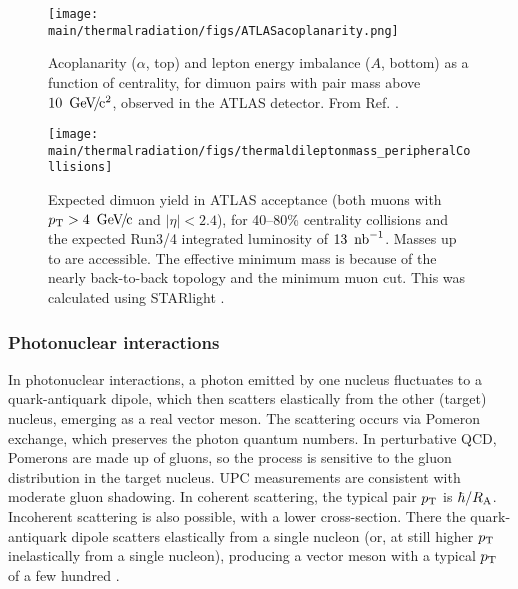 \documentclass[../report.tex]{subfiles}
\providecommand{\main}{..}
\begin{document}
\begin{figure}[htb]
\centering
\texttt{[image: \\main/thermalradiation/figs/ATLASacoplanarity.png]}
\caption{Acoplanarity ($\alpha$, top) and lepton energy imbalance ($A$, bottom) as a function of centrality, for dimuon pairs with pair mass above $\unit[10]{\UGeVcc}$, observed in the ATLAS detector.  From Ref. \cite{Aaboud:2018eph}.}
\label{fig:ATLASacoplanarity}
\end{figure}

\begin{figure}[htb]
\centering
\texttt{[image: \\main/thermalradiation/figs/thermaldileptonmass\_peripheralCollisions]}
\caption{Expected dimuon yield in ATLAS acceptance (both muons with $\pT>\unit[4]{\UGeVc}$ and $|\eta|<2.4$), for 40--80\% centrality \PbPb{} collisions and the expected Run3/4 integrated luminosity of $\unit[13]{\Unb^{-1}}$.  Masses up to \unit[100]{\UGeVcc} are accessible.  The effective \unit[8]{\UGeVcc} minimum mass is because of the nearly back-to-back topology and the \unit[4]{\UGeVc} minimum muon \pT{} cut. This was calculated using STARlight \cite{Klein:2016yzr,Klein:2018cjh}.
}
\label{fig:project} 
\end{figure}


\subsubsection{Photonuclear interactions}

In photonuclear interactions, a photon emitted by one nucleus fluctuates to a quark-antiquark dipole, which then scatters elastically from the other (target) nucleus, emerging as a real vector meson.  The scattering occurs via Pomeron exchange, which preserves the photon quantum numbers.  In perturbative QCD, Pomerons are made up of gluons, so the process is sensitive to the gluon distribution in the target nucleus.  UPC measurements are consistent with moderate gluon shadowing.   In coherent scattering, the typical pair $p\sb{\scriptstyle\mathrm{T}}$ is $\hbar/R_{\rm A}$.  Incoherent scattering is also possible, with a lower cross-section.  There the quark-antiquark dipole scatters elastically from a single nucleon (or, at still higher $p\sb{\scriptstyle\mathrm{T}}$ inelastically from a single nucleon), producing a vector meson with a typical $p\sb{\scriptstyle\mathrm{T}}$ of a few hundred \unit[]{\UMeVc}.
\end{document}
